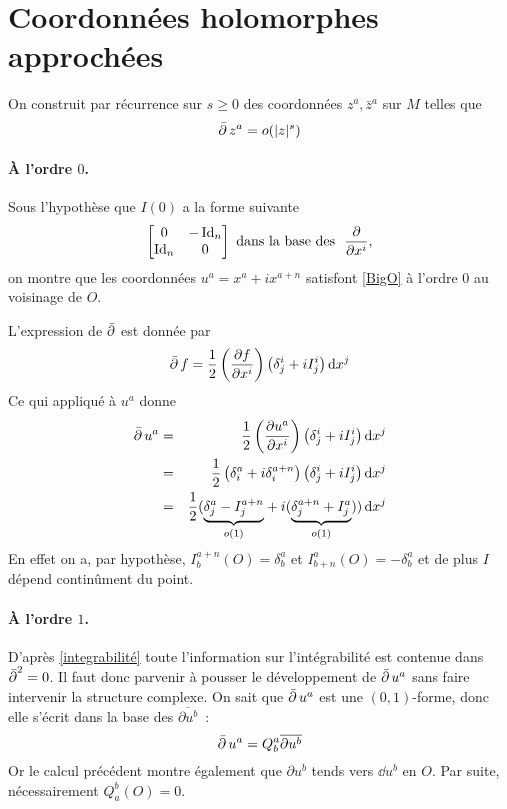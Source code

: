\documentclass[12pt,draft]{article}
\begin{document}
\section{Coordonnées holomorphes approchées \cite{Demailly}}

On construit par récurrence sur $s\geq 0$ des coordonnées $z^a, \bar{z}^a$ sur $M$ telles que
\begin{equation}\label{BigO}
\operatorname{\bar{\partial}} z^a = o(|z|^s)
\end{equation}

\paragraph*{À l'ordre $0$.} Sous l'hypothèse que $I(0)$ a la forme suivante
\[
\begin{bmatrix}
0 & -\Id_n \\ 
\Id_n & 0
\end{bmatrix} 
\text{
dans la base des } \ 
\dpp{}{x^i},
\]
on montre que les coordonnées $u^a = x^a + i x^{a+n}$ satisfont \eqref{BigO} à l'ordre $0$ au voisinage de $O$.

L'expression de $\operatorname{\bar{\partial}}$ est donnée par
\[
\operatorname{\bar{\partial}} f = \operatorname{\frac{1}{2}} \left(
\dfrac{\partial{f}}{\partial{x^i}}
\right)\left(\delta^i_j + i I^i_j\right) \operatorname{d\!} x^j
\]
Ce qui appliqué à $u^a$ donne
\begin{eqnarray*}
\operatorname{\bar{\partial}} u^a & = &  \operatorname{\frac{1}{2}} \left(
\dfrac{\partial{u^a}}{\partial{x^i}}
\right)\left(\delta^i_j + i I^i_j\right) \operatorname{d\!} x^j\\
& = & \operatorname{\frac{1}{2}} \left(
\delta^a_i + i \delta^{a+n}_i
\right)\left(\delta^i_j + i I^i_j\right) \operatorname{d\!} x^j\\
& = & \operatorname{\frac{1}{2}} (
\underset{o(1)}{\underbrace{\delta^a_j - I^{a+n}_j}} + i(\underset{o(1)}{\underbrace{\delta^{a+n}_j + I^a_j}})
) \operatorname{d\!} x^j
\end{eqnarray*}
En effet on a, par hypothèse, $I^{a+n}_b(O) = \delta^a_b$ et  $I^a_{b+n}(O) = -\delta^a_b$ et de plus $I$ dépend continûment du point.

\paragraph*{À l'ordre $1$.}
D'après \autoref{integrabilité} toute l'information sur l'intégrabilité est contenue dans $\operatorname{\bar{\partial}}^2 = 0$. Il faut donc parvenir à pousser le développement de $\operatorname{\bar{\partial}} u^a$ sans faire intervenir la structure complexe.
On sait que $\operatorname{\bar{\partial}} u^a$ est une $(0,1)$-forme, donc elle s'écrit dans la base des $\overline{\partial u^b}$~:
\[
\operatorname{\bar{\partial}} u^a = Q^a_b \overline{\partial u^b}
\]
Or le calcul précédent montre également que $\partial u^b$ tends vers $\dd u^b$ en $O$. Par suite, nécessairement $Q_a^b(O) = 0$.
\end{document}

